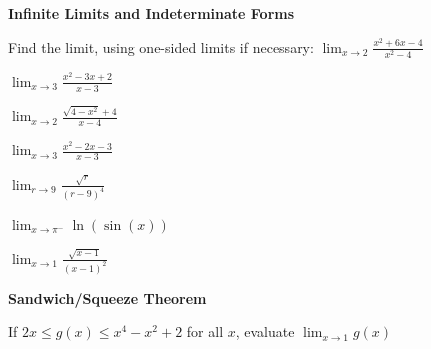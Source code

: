 \documentclass{ximera}
\begin{document}
 \textbf{Infinite Limits and Indeterminate Forms}
   \begin{exercise}
      Find the limit, using one-sided limits if necessary: $\displaystyle \lim_{x\rightarrow 2} \frac{x^2+6x-4}{x^2-4}$
   \end{exercise}

   \begin{exercise}
     $\displaystyle \lim_{x\rightarrow 3}\frac{x^2-3x+2}{x-3}$\\
   \end{exercise}

   \begin{exercise}
      $\displaystyle \lim_{x\rightarrow 2} \frac{\sqrt{4-x^2}+4}{x-4}$
   \end{exercise}

   \begin{exercise}
      $\displaystyle \lim_{x\rightarrow 3}\frac{x^2-2x-3}{x-3}$
   \end{exercise}

   \begin{exercise}
      $\displaystyle\lim_{r\rightarrow 9}\frac{\sqrt{r}}{(r-9)^4}$
   \end{exercise}

   \begin{exercise}
     $\displaystyle\lim_{x\rightarrow \pi^-} \ln(\sin(x))$\\
   \end{exercise}

   \begin{exercise}
      $\displaystyle \lim_{x\rightarrow 1}\frac{\sqrt{x-1}}{(x-1)^2}$
   \end{exercise}


\textbf{Sandwich/Squeeze Theorem}
   \begin{exercise}
     If $2x\leq g(x)\leq x^4-x^2+2$ for all $x$, evaluate $\displaystyle \lim_{x\rightarrow 1} g(x)$
   \end{exercise}
\end{document}
